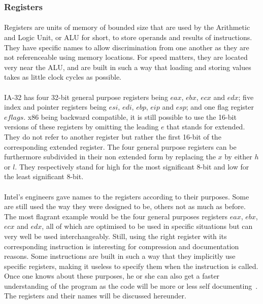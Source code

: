 \subsubsection{Registers} \label{sec:registers}
\paragraph{}
Registers are units of memory of bounded size that are used by the Arithmetic and Logic Unit, or ALU for short, to store operands and results of instructions. They have specific names to allow discrimination from one another as they are not referenceable using memory locations. For speed matters, they are located very near the ALU, and are built in such a way that loading and storing values takes as little clock cycles as possible.

\paragraph{}
IA-32 has four 32-bit general purpose registers being $eax$, $ebx$, $ecx$ and $edx$; five index and pointer registers being $esi$, $edi$, $ebp$, $eip$ and $esp$; and one flag register $eflags$. x86 being backward compatible, it is still possible to use the 16-bit versions of these registers by omitting the leading $e$ that stands for extended. They do not refer to another register but rather the first 16-bit of the corresponding extended register. The four general purpose registers can be furthermore subdivided in their non extended form by replacing the $x$ by either $h$ or $l$. They respectively stand for high for the most significant 8-bit and low for the least significant 8-bit.

\paragraph{}
Intel's engineers gave names to the registers according to their purposes. Some are still used the way they were designed to be, others not as much as before. The most flagrant example would be the four general purposes registers $eax$, $ebx$, $ecx$ and $edx$, all of which are optimised to be used in specific situations but can very well be used interchangeably. Still, using the right register with its corresponding instruction is interesting for compression and documentation reasons. Some instructions are built in such a way that they implicitly use specific registers, making it useless to specify them when the instruction is called. Once one knows about these purposes, he or she can also get a faster understanding of the program as the code will be more or less self documenting~\cite{relawdaq}. The registers and their names will be discussed hereunder.

